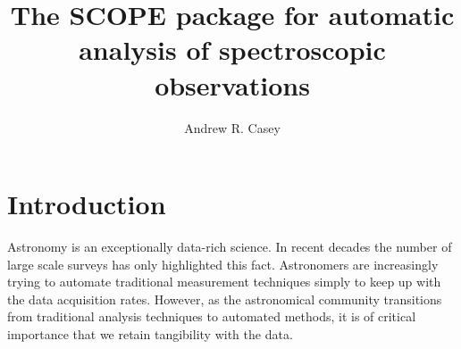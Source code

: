 \documentclass{emulateapj}
\begin{document}
\title{The SCOPE package for automatic analysis of spectroscopic observations}


\author{Andrew R. Casey}

\begin{abstract}
\end{abstract}





\section{Introduction}
Astronomy is an exceptionally data-rich science. In recent decades the number of large scale surveys has only highlighted this fact. Astronomers are increasingly trying to automate traditional measurement techniques simply to keep up with the data acquisition rates. However, as the astronomical community transitions from traditional analysis techniques to automated methods, it is of critical importance that we retain tangibility with the data. 





% 



\end{document}
